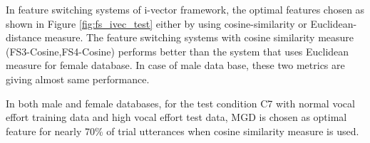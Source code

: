 \documentclass{article}
\begin{document}
\vspace{0.25cm}

In feature switching systems of i-vector framework, the optimal features chosen as shown in Figure \ref{fig:fs_ivec_test} either by using cosine-similarity  or Euclidean-distance measure. The feature switching systems with cosine similarity measure  (FS3-Cosine,FS4-Cosine) performs better than the system that uses Euclidean measure for female database. In case of male data base, these two metrics are giving almost same performance. 

\vspace{0.25cm}
In both male and female databases, for the test condition C7 with normal vocal effort training data and high vocal effort test data, MGD is chosen as optimal feature for nearly 70\% of trial utterances when cosine similarity measure is used. 


\clearpage









\end{document}
